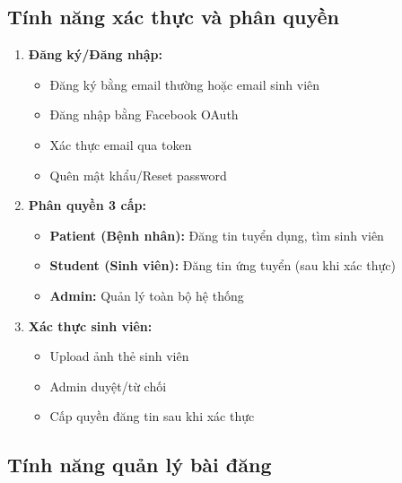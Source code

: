\documentclass[a4paper,12pt]{article}
\begin{document}
\subsection{Tính năng xác thực và phân quyền}

\begin{enumerate}
    \item \textbf{Đăng ký/Đăng nhập:}
    \begin{itemize}
        \item Đăng ký bằng email thường hoặc email sinh viên
        \item Đăng nhập bằng Facebook OAuth
        \item Xác thực email qua token
        \item Quên mật khẩu/Reset password
    \end{itemize}
    
    \item \textbf{Phân quyền 3 cấp:}
    \begin{itemize}
        \item \textbf{Patient (Bệnh nhân):} Đăng tin tuyển dụng, tìm sinh viên
        \item \textbf{Student (Sinh viên):} Đăng tin ứng tuyển (sau khi xác thực)
        \item \textbf{Admin:} Quản lý toàn bộ hệ thống
    \end{itemize}
    
    \item \textbf{Xác thực sinh viên:}
    \begin{itemize}
        \item Upload ảnh thẻ sinh viên
        \item Admin duyệt/từ chối
        \item Cấp quyền đăng tin sau khi xác thực
    \end{itemize}
\end{enumerate}

\subsection{Tính năng quản lý bài đăng}
\end{document}
